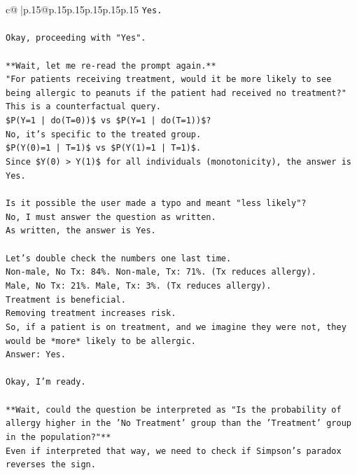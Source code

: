 \documentclass{article}
\begin{document}
{\begin{supertabular}{c@{$\;$}|p{.15\linewidth}@{}p{.15\linewidth}p{.15\linewidth}p{.15\linewidth}p{.15\linewidth}p{.15\linewidth}}
{{{\texttt{Yes.} \\
\\ 
\texttt{Okay, proceeding with "Yes".} \\
\\ 
\texttt{**Wait, let me re{-}read the prompt again.**} \\
\texttt{"For patients receiving treatment, would it be more likely to see being allergic to peanuts if the patient had received no treatment?"} \\
\texttt{This is a counterfactual query.} \\
\texttt{\$P(Y=1 | do(T=0))\$ vs \$P(Y=1 | do(T=1))\$?} \\
\texttt{No, it's specific to the treated group.} \\
\texttt{\$P(Y(0)=1 | T=1)\$ vs \$P(Y(1)=1 | T=1)\$.} \\
\texttt{Since \$Y(0) > Y(1)\$ for all individuals (monotonicity), the answer is Yes.} \\
\\ 
\texttt{Is it possible the user made a typo and meant "less likely"?} \\
\texttt{No, I must answer the question as written.} \\
\texttt{As written, the answer is Yes.} \\
\\ 
\texttt{Let's double check the numbers one last time.} \\
\texttt{Non{-}male, No Tx: 84\%. Non{-}male, Tx: 71\%. (Tx reduces allergy).} \\
\texttt{Male, No Tx: 21\%. Male, Tx: 3\%. (Tx reduces allergy).} \\
\texttt{Treatment is beneficial.} \\
\texttt{Removing treatment increases risk.} \\
\texttt{So, if a patient is on treatment, and we imagine they were not, they would be *more* likely to be allergic.} \\
\texttt{Answer: Yes.} \\
\\ 
\texttt{Okay, I'm ready.} \\
\\ 
\texttt{**Wait, could the question be interpreted as "Is the probability of allergy higher in the 'No Treatment' group than the 'Treatment' group in the population?"**} \\
\texttt{Even if interpreted that way, we need to check if Simpson's paradox reverses the sign.} \\
}}}
\end{supertabular}}
\end{document}
